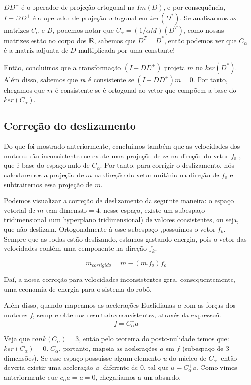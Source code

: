 \documentclass{article}
\def\bkRsf{{\sf \mbox{\vrule height0.705em width0.06em
            depth0em}\kern-.04em R}}
\begin{document}
$DD^+$ é o operador de projeção ortogonal na $Im(D)$, e por consequência, $I - DD^+$ é o operador de projeção ortogonal em $ker(D^*)$.
Se analisarmos as matrizes $C_{\alpha}$ e $D$, podemos notar que $C_{\alpha} = (1/{\alpha}M)(D^T)$, como nossas matrizes estão no corpo dos $\bkRsf$, sabemos que $D^T = D^*$, então podemos ver que $C_{\alpha}$ é a matriz adjunta de $D$ multiplicada por uma constante!

Então, concluimos que a transformação $(I-DD^+)$ projeta $m$ no $ker(D^*)$. Além disso, sabemos que $m$ é consistente se $(I-DD^+)m = 0$. Por tanto, chegamos que $m$ é consistente se é ortogonal ao vetor que compõem a base do $ker(C_{\alpha})$.

\subsection{Correção do deslizamento}

\hspace{1cm} Do que foi mostrado anteriormente, concluimos também que as velocidades dos motores são inconsistentes se existe uma projeção de $m$ na direção do vetor $f_o$ , que é base do espaço nulo de $C_{\alpha}$. Por tanto, para corrigir o deslizamento, nós calcularemos a projeção de $m$ na direção do vetor unitário na direção de $f_{o}$ e subtrairemos essa projeção de $m$.

Podemos visualizar a correção de deslizamento da seguinte maneira: o espaço vetorial de $m$ tem $\text{dimensão}= 4$. nesse espaço, existe um subespaço tridimensional (um hyperplano tridimensional) de valores consistentes, ou seja, que não deslizam. Ortogonalmente à esse subespaço ,possuímos o vetor $f_{k}$. Sempre que as rodas estão deslizando, estamos gastando energia, pois o vetor das velocidades contém uma componente na direção $f_{k}$.

\[m_{corrigido} = m - (m . f_{o})f_{o}\]

Daí, a nossa correção para velocidades inconsistentes gera, consequentemente, uma economia de energia para o sistema do robô.

Além disso, quando mapeamos as acelerações Euclidianas $a$ com as forças dos motores $f$, sempre obtemos resultados consistentes, através da expressaõ:
\[f = C_{\alpha}^+a\]

Veja que $rank(C_{\alpha}) = 3$, então pelo teorema do posto-nulidade temos que: $ker(C_{\alpha}) = 0$. $C_{\alpha}$, portanto, mapeia as acelerações $a$  em $f$ (subespaço de 3 dimensões). Se esse espaço possuísse algum elemento $u$ do núcleo de $C_{\alpha}$, então deveria existir uma aceleração $a$, diferente de 0, tal que $u = C_{\alpha}^+a$. Como vimos anteriormente que $c_ {\alpha}u = a = 0$, chegaríamos a um absurdo.
\end{document}
